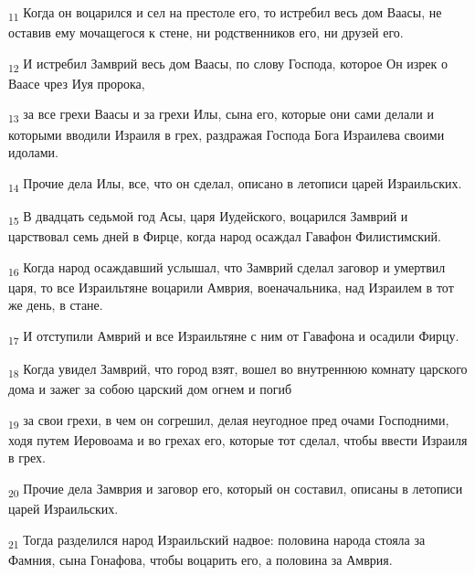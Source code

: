 \begin{tcolorbox}
\textsubscript{11} Когда он воцарился и сел на престоле его, то истребил весь дом Ваасы, не оставив ему мочащегося к стене, ни родственников его, ни друзей его.
\end{tcolorbox}
\begin{tcolorbox}
\textsubscript{12} И истребил Замврий весь дом Ваасы, по слову Господа, которое Он изрек о Ваасе чрез Иуя пророка,
\end{tcolorbox}
\begin{tcolorbox}
\textsubscript{13} за все грехи Ваасы и за грехи Илы, сына его, которые они сами делали и которыми вводили Израиля в грех, раздражая Господа Бога Израилева своими идолами.
\end{tcolorbox}
\begin{tcolorbox}
\textsubscript{14} Прочие дела Илы, все, что он сделал, описано в летописи царей Израильских.
\end{tcolorbox}
\begin{tcolorbox}
\textsubscript{15} В двадцать седьмой год Асы, царя Иудейского, воцарился Замврий и царствовал семь дней в Фирце, когда народ осаждал Гавафон Филистимский.
\end{tcolorbox}
\begin{tcolorbox}
\textsubscript{16} Когда народ осаждавший услышал, что Замврий сделал заговор и умертвил царя, то все Израильтяне воцарили Амврия, военачальника, над Израилем в тот же день, в стане.
\end{tcolorbox}
\begin{tcolorbox}
\textsubscript{17} И отступили Амврий и все Израильтяне с ним от Гавафона и осадили Фирцу.
\end{tcolorbox}
\begin{tcolorbox}
\textsubscript{18} Когда увидел Замврий, что город взят, вошел во внутреннюю комнату царского дома и зажег за собою царский дом огнем и погиб
\end{tcolorbox}
\begin{tcolorbox}
\textsubscript{19} за свои грехи, в чем он согрешил, делая неугодное пред очами Господними, ходя путем Иеровоама и во грехах его, которые тот сделал, чтобы ввести Израиля в грех.
\end{tcolorbox}
\begin{tcolorbox}
\textsubscript{20} Прочие дела Замврия и заговор его, который он составил, описаны в летописи царей Израильских.
\end{tcolorbox}
\begin{tcolorbox}
\textsubscript{21} Тогда разделился народ Израильский надвое: половина народа стояла за Фамния, сына Гонафова, чтобы воцарить его, а половина за Амврия.
\end{tcolorbox}
